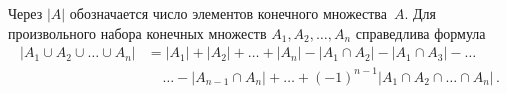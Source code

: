 


\begingroup
    \def\abs#1{\lvert #1 \rvert}%
    \def\binom#1#2{\mathrm{C}_{#1}^{#2}}%

Через $\abs{A}$ обозначается число элементов конечного множества~$A$.
Для произвольного набора конечных множеств $A_{1}, A_{2}, \ldots, A_{n}$
справедлива формула
\begin{align*}
    \abs{A_{1} \cup A_{2} \cup \ldots \cup A_{n}}
& =
    \abs{A_{1}} + \abs{A_{2}} + \ldots + \abs{A_{n}}
    - \abs{A_{1} \cap A_{2}} - \abs{A_{1} \cap A_{3}}
    - \ldots \\ & \mspace{20mu} \ldots
    - \abs{A_{n-1} \cap A_{n}}
    + \ldots +
    (-1)^{n-1} \abs{A_{1} \cap A_{2} \cap \ldots \cap A_{n}}
\, . \end{align*}


